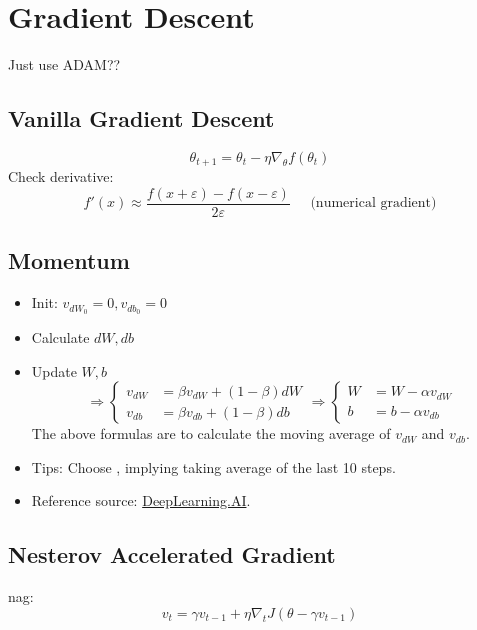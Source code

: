 \section{Gradient Descent}
\note Just use ADAM??

\subsection{Vanilla Gradient Descent}
\begin{equation}
	\theta_{t+1} = \theta_t - \eta\nabla_\theta f(\theta_t)
\end{equation}
Check derivative:
\begin{equation}
	f'(x) \approx \frac{f(x+\varepsilon) - f(x-\varepsilon)}{2\varepsilon} \;\;\;\;\; \text{(numerical gradient)}
\end{equation}

\subsection{Momentum}
\begin{itemize}
	\item Init: $v_{dW_0} = 0, v_{db_0} = 0$
	\item Calculate $dW, db$
	\item Update $W, b$
	\begin{equation}
		\Rightarrow \begin{cases}
			v_{dW} &= \beta v_{dW} + (1-\beta)dW\\
			v_{db} &= \beta v_{db} + (1-\beta)db
		\end{cases}
		\Rightarrow
		\begin{cases}
			W &= W - \alpha v_{dW}\\
			b &= b - \alpha v_{db}
		\end{cases}
	\end{equation}
	The above formulas are to calculate the moving average of $v_{dW}$ and $v_{db}$.
	\item Tips: Choose , implying taking average of the last 10 steps.
	\item Reference source: \href{https://youtu.be/k8fTYJPd3_I}{DeepLearning.AI}.
\end{itemize}

\subsection{Nesterov Accelerated Gradient}
\ac{nag}:
\begin{equation}
	v_t = \gamma v_{t-1} + \eta \nabla_tJ\left(\theta - \gamma v_{t-1}\right)
\end{equation}

